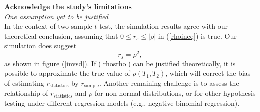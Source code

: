 \documentclass[12pt, a4paper]{article}
\begin{document}
	\textbf{	Acknowledge the study’s limitations \\}
	\textit{One assumption yet to be justified}\\
	In the context of two sample $t$-test, the simulation results agree with our theoretical
	conclusion, assuming that  $0\leq r_s \leq |\rho|$ in (\ref{rhoineq}) is true. Our simulation does
	suggest 
	\begin{equation}\label{rhosrho}
		r_s = \rho^2, 
	\end{equation}
	as shown in figure (\ref{invsd}). If (\ref{rhosrho}) can be justified theoretically, it is possible
	to approximate the true value of $\rho(T_1, T_2)$, which will correct the bias of estimating
	$r_\text{statistics}$ by $r_\text{sample}$. Another remaining challenge is to assess the
	relationship of $r_\text{statistics}$  and $\rho$ for non-normal distributions, or for other
	hypothesis testing under different regression models (e.g., negative binomial regression).  
	
	
	
	\newpage
\end{document}
